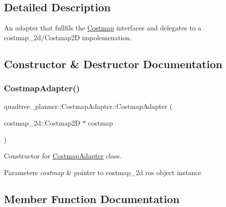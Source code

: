 \subsection{Detailed Description}
An adapter that fullfils the \hyperlink{classquadtree__planner_1_1Costmap}{Costmap} interfaces and delegates to a costmap\+\_\+2d/\+Costmap2D impolemenation. 

\subsection{Constructor \& Destructor Documentation}
\mbox{\label{classquadtree__planner_1_1CostmapAdapter_a3efe5b09f0fc3c5f3c0df1557854a8d7}} 
\subsubsection{\texorpdfstring{Costmap\+Adapter()}{CostmapAdapter()}}
{\footnotesize\ttfamily quadtree\+\_\+planner\+::\+Costmap\+Adapter\+::\+Costmap\+Adapter (\begin{DoxyParamCaption}\item[{costmap\+\_\+2d\+::\+Costmap2D $\ast$}]{costmap }\end{DoxyParamCaption})}



Constructor for \hyperlink{classquadtree__planner_1_1CostmapAdapter}{Costmap\+Adapter} class. 


\begin{DoxyParams}{Parameters}
{\em costmap} & pointer to costmap\+\_\+2d ros object instance \\
\hline
\end{DoxyParams}


\subsection{Member Function Documentation}
\mbox{\label{classquadtree__planner_1_1CostmapAdapter_af5b15c508adabc428aabde14253c9468}} 
